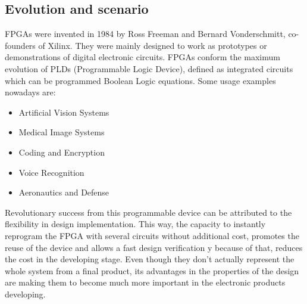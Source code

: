 \subsection{Evolution and scenario}

FPGAs were invented in 1984 by Ross Freeman and Bernard Vonderschmitt, co-founders of Xilinx\cite{Xilinkx}. They were mainly designed to work as prototypes or demonstrations of digital electronic circuits. FPGAs conform the maximum evolution of PLDs (Programmable Logic Device), defined as integrated circuits which can be programmed Boolean Logic equations. Some usage examples nowadays are:
\begin{itemize}
	\item Artificial Vision Systems
	\item Medical Image Systems
	\item Coding and Encryption
	\item Voice Recognition
	\item Aeronautics and Defense
\end{itemize}

Revolutionary success from this programmable device can be attributed to the flexibility in design implementation. This way, the capacity to instantly reprogram the FPGA with several circuits without additional cost, promotes the reuse of the device and allows a fast design verification y because of that, reduces the cost in the developing stage. Even though they don’t actually represent the whole system from a final product, its advantages in the properties of the design are making them to become much more important in the electronic products developing. \newline

